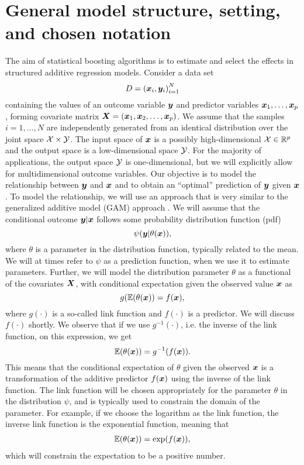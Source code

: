 \section{General model structure, setting, and chosen notation} %
The aim of statistical boosting algorithms is to estimate and select the effects in structured additive regression models.
Consider a data set
\begin{equation}\label{eq:data-setting}
    D=\left(\bm{x}_i,\bm{y}_i\right)_{i=1}^N
\end{equation}
containing the values of an outcome variable $\bm{y}$ and predictor variables $\bm{x}_1,\ldots,\bm{x}_p$, forming covariate matrix $\bm{X}=(\bm{x}_1, \bm{x}_2,\ldots,\bm{x}_p)$.
We assume that the samples $i=1,\ldots,N$ are independently generated from an identical distribution over the joint space $\mathcal{X}\times\mathcal{Y}$.
The input space of $\bm{x}$ is a possibly high-dimensional $\mathcal{X}\in\mathbb{R}^p$ and the output space is a low-dimensional space $\mathcal{Y}$.
For the majority of applications, the output space $\mathcal{Y}$ is one-dimensional, but we will explicitly allow for multidimensional outcome variables.
Our objective is to model the relationship between $\bm{y}$ and $\bm{x}$ and to obtain an ``optimal'' prediction of $\bm{y}$ given $\bm{x}$.
To model the relationship, we will use an approach that is very similar to the generalized additive model (GAM) approach \citep{gam-book}.
We will assume that the conditional outcome $\bm{y}|\bm{x}$ follows some probability distribution function (pdf)
\begin{equation}\label{eq:psi}
    \psi(\bm{y}|\theta(\bm{x})),
\end{equation}
where $\theta$ is a parameter in the distribution function, typically related to the mean. We will at times refer to $\psi$ as a prediction function, when we use it to estimate parameters.
Further, we will model the distribution parameter $\theta$ as a functional of the covariates $\bm{X}$, with conditional expectation given the observed value $\bm{x}$ as
\begin{equation}
    g(\mathbb{E}(\theta(\bm{x}))=f(\bm{x}),
\end{equation}
where $g(\cdot)$ is a so-called link function and $f(\cdot)$ is a predictor.
We will discuss $f(\cdot)$ shortly.
We observe that if we use $g^{-1}(\cdot)$, i.e. the inverse of the link function, on this expression, we get
\begin{equation*}
    \mathbb{E}(\theta(\bm{x}))=g^{-1}(f(\bm{x})).
\end{equation*}
This means that the conditional expectation of $\theta$ given the observed $\bm{x}$ is a transformation of the additive predictor $f(\bm{x})$ using the inverse of the link function.
The link function will be chosen appropriately for the parameter $\theta$ in the distribution $\psi$, and is typically used to constrain the domain of the parameter.
For example, if we choose the logarithm as the link function, the inverse link function is the exponential function, meaning that
\begin{align}
    \mathbb{E}(\theta(\bm{x}))=\exp(f(\bm{x})),
\end{align}
which will constrain the expectation to be a positive number.

